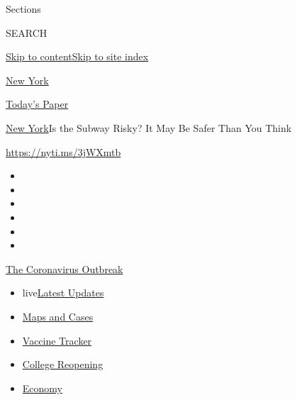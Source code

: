 Sections

SEARCH

\protect\hyperlink{site-content}{Skip to
content}\protect\hyperlink{site-index}{Skip to site index}

\href{https://www.nytimes3xbfgragh.onion/section/nyregion}{New York}

\href{https://myaccount.nytimes3xbfgragh.onion/auth/login?response_type=cookie\&client_id=vi}{}

\href{https://www.nytimes3xbfgragh.onion/section/todayspaper}{Today's
Paper}

\href{/section/nyregion}{New York}\textbar{}Is the Subway Risky? It May
Be Safer Than You Think

\url{https://nyti.ms/3jWXmtb}

\begin{itemize}
\item
\item
\item
\item
\item
\item
\end{itemize}

\href{https://www.nytimes3xbfgragh.onion/news-event/coronavirus?action=click\&pgtype=Article\&state=default\&region=TOP_BANNER\&context=storylines_menu}{The
Coronavirus Outbreak}

\begin{itemize}
\tightlist
\item
  live\href{https://www.nytimes3xbfgragh.onion/2020/08/03/world/coronavirus-covid-19.html?action=click\&pgtype=Article\&state=default\&region=TOP_BANNER\&context=storylines_menu}{Latest
  Updates}
\item
  \href{https://www.nytimes3xbfgragh.onion/interactive/2020/us/coronavirus-us-cases.html?action=click\&pgtype=Article\&state=default\&region=TOP_BANNER\&context=storylines_menu}{Maps
  and Cases}
\item
  \href{https://www.nytimes3xbfgragh.onion/interactive/2020/science/coronavirus-vaccine-tracker.html?action=click\&pgtype=Article\&state=default\&region=TOP_BANNER\&context=storylines_menu}{Vaccine
  Tracker}
\item
  \href{https://www.nytimes3xbfgragh.onion/2020/08/02/us/covid-college-reopening.html?action=click\&pgtype=Article\&state=default\&region=TOP_BANNER\&context=storylines_menu}{College
  Reopening}
\item
  \href{https://www.nytimes3xbfgragh.onion/live/2020/08/03/business/stock-market-today-coronavirus?action=click\&pgtype=Article\&state=default\&region=TOP_BANNER\&context=storylines_menu}{Economy}
\end{itemize}


